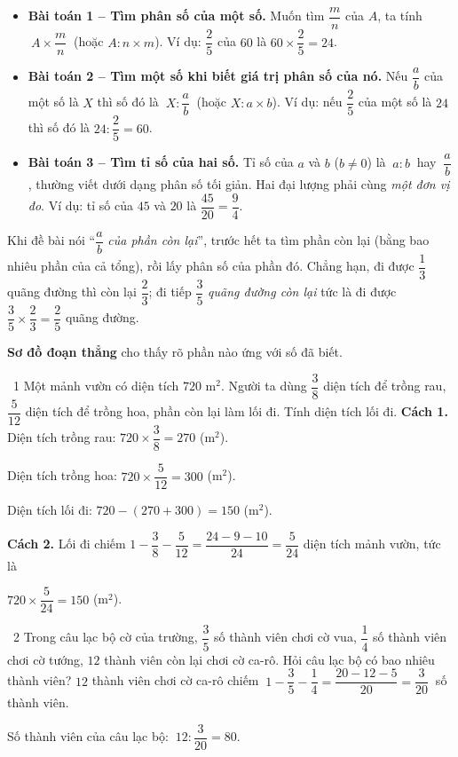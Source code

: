 \begin{knowbox}\begin{itemize}[leftmargin=1.4em,itemsep=4pt]
\item \textbf{Bài toán 1 -- Tìm phân số của một số.} Muốn tìm $\dfrac mn$ của $A$, ta tính $\ A\times\dfrac mn\ $ (hoặc $A:n\times m$). \quad Ví dụ: $\dfrac25$ của $60$ là $60\times\dfrac25=24$.
\item \textbf{Bài toán 2 -- Tìm một số khi biết giá trị phân số của nó.} Nếu $\dfrac ab$ của một số là $X$ thì số đó là $\ X:\dfrac ab\ $ (hoặc $X:a\times b$). \quad Ví dụ: nếu $\dfrac25$ của một số là $24$ thì số đó là $24:\dfrac25=60$.
\item \textbf{Bài toán 3 -- Tìm tỉ số của hai số.} Tỉ số của $a$ và $b$ ($b\ne0$) là $\ a:b\ $ hay $\ \dfrac ab$, thường viết dưới dạng phân số tối giản. Hai đại lượng phải cùng \emph{một đơn vị đo}. \quad Ví dụ: tỉ số của $45$ và $20$ là $\dfrac{45}{20}=\dfrac94$.
\end{itemize}\end{knowbox}
\gap
{}
\begin{knowbox}
Khi đề bài nói ``$\dfrac ab$ \emph{của phần còn lại}'', trước hết ta tìm phần còn lại (bằng bao nhiêu phần của cả tổng), rồi lấy phân số của phần đó. Chẳng hạn, đi được $\dfrac13$ quãng đường thì còn lại $\dfrac23$; đi tiếp $\dfrac35$ \emph{quãng đường còn lại} tức là đi được $\dfrac35\times\dfrac23=\dfrac25$ quãng đường.\par\smallskip
\textbf{Sơ đồ đoạn thẳng} cho thấy rõ phần nào ứng với số đã biết.
\end{knowbox}
\gap
\begin{exbox}{\ExWord\ 1}
Một mảnh vườn có diện tích $720$ m$^2$. Người ta dùng $\dfrac38$ diện tích để trồng rau, $\dfrac5{12}$ diện tích để trồng hoa, phần còn lại làm lối đi. Tính diện tích lối đi.
\guide
\textbf{Cách 1.} Diện tích trồng rau: $720\times\dfrac38=270$ (m$^2$).\par Diện tích trồng hoa: $720\times\dfrac5{12}=300$ (m$^2$).\par
Diện tích lối đi: $720-(270+300)=150$ (m$^2$).\par
\textbf{Cách 2.} Lối đi chiếm $1-\dfrac38-\dfrac5{12}=\dfrac{24-9-10}{24}=\dfrac5{24}$ diện tích mảnh vườn, tức là\par $720\times\dfrac5{24}=150$ (m$^2$).
\end{exbox}
\gap
\begin{exbox}{\ExWord\ 2}
Trong câu lạc bộ cờ của trường, $\dfrac35$ số thành viên chơi cờ vua, $\dfrac14$ số thành viên chơi cờ tướng, $12$ thành viên còn lại chơi cờ ca-rô. Hỏi câu lạc bộ có bao nhiêu thành viên?
\guide
$12$ thành viên chơi cờ ca-rô chiếm $\ 1-\dfrac35-\dfrac14=\dfrac{20-12-5}{20}=\dfrac3{20}\ $ số thành viên.\par
Số thành viên của câu lạc bộ: $\ 12:\dfrac3{20}=80$.
\end{exbox}

